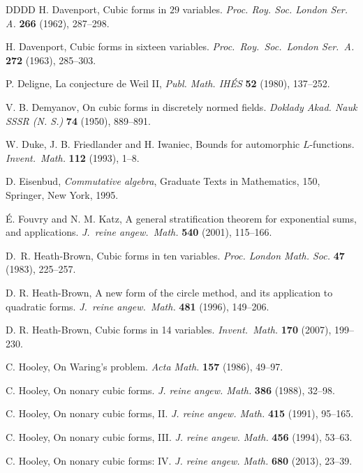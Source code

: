 \documentclass[a4paper,11pt, twoside,reqno]{amsart}
\theoremstyle{plain}
\theoremstyle{definition}
\theoremstyle{remark}
\numberwithin{equation}{section}
\begin{document}
\begin{thebibliography}{DDDD}
H. Davenport, Cubic forms in $29$ variables. {\em Proc. Roy. Soc. London Ser. A.} {\bf 266} (1962), 287--298.

 H. Davenport,
Cubic forms in sixteen variables.
{\em Proc.\ Roy.\ Soc.\ London Ser.\ A.} {\bf 272} (1963), 285--303.

P. Deligne, La conjecture de Weil II,
\emph{Publ. Math. IH\'ES} \textbf{52} (1980), 137--252.

V. B. Demyanov, On cubic forms in discretely normed fields. {\em Doklady Akad. Nauk SSSR (N. S.)} {\bf 74} (1950), 889--891.

W. Duke,  J. B. Friedlander and H. Iwaniec, 
Bounds for automorphic $L$-functions. {\em Invent.\ Math.} {\bf 112} (1993), 
1--8.

D. Eisenbud, {\it Commutative algebra}, Graduate Texts in Mathematics, 150, Springer, New York, 1995.


 {\'E}. Fouvry and N. M. Katz, A general stratification theorem for exponential sums, and applications. 
{\em  J.\ reine angew.\ Math.} {\bf 540}
(2001), 115--166.


 D.~R. Heath-Brown,
Cubic forms in ten variables.
{\em Proc. London Math. Soc.}
{\bf 47} (1983), 225--257.

D. R. Heath-Brown,
A new form of the circle method, and its application to quadratic forms. 
{\em  J.\ reine angew.\ Math.} {\bf 481}
(1996), 149--206.


 D. R. Heath-Brown, Cubic forms in 14 variables. {\em Invent.\ Math.} 
{\bf 170}  (2007), 199--230.

C. Hooley, On Waring’s problem. {\em Acta Math.} {\bf 157} (1986), 49--97.


C. Hooley, On nonary cubic forms.
{\em J. reine angew. Math.} {\bf 386} (1988), 32--98.

C. Hooley, On nonary cubic forms, II. 
{\em J. reine angew. Math.}
 {\bf 415} (1991), 95--165.

C. Hooley, On nonary cubic forms, III. 
{\em J. reine angew. Math.}
 {\bf 456} (1994), 53--63.

 C. Hooley, On nonary cubic forms: IV. {\em J. reine angew. Math.} {\bf 680} (2013), 23--39.
 

\end{thebibliography}
\end{document}
